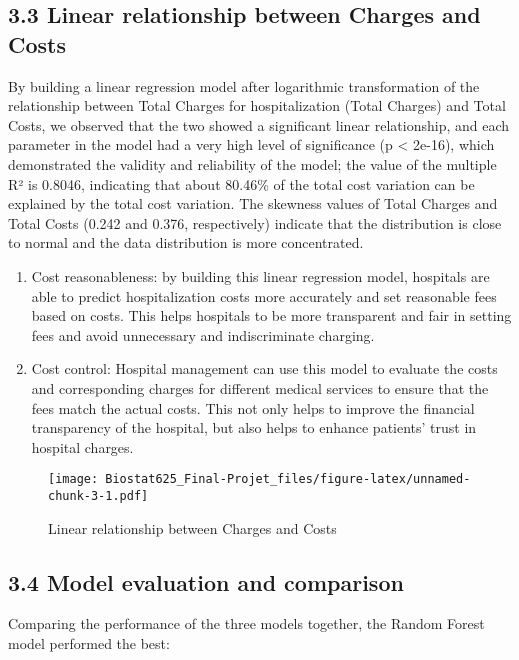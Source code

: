 \documentclass[
  10pt,
]{article}
\begin{document}
\subsection{3.3 Linear relationship between Charges and
Costs}\label{linear-relationship-between-charges-and-costs}

By building a linear regression model after logarithmic transformation
of the relationship between Total Charges for hospitalization (Total
Charges) and Total Costs, we observed that the two showed a significant
linear relationship, and each parameter in the model had a very high
level of significance (p \textless{} 2e-16), which demonstrated the
validity and reliability of the model; the value of the multiple R² is
0.8046, indicating that about 80.46\% of the total cost variation can be
explained by the total cost variation. The skewness values of Total
Charges and Total Costs (0.242 and 0.376, respectively) indicate that
the distribution is close to normal and the data distribution is more
concentrated.

\begin{enumerate}
\def\labelenumi{(\arabic{enumi})}
\item
  Cost reasonableness: by building this linear regression model,
  hospitals are able to predict hospitalization costs more accurately
  and set reasonable fees based on costs. This helps hospitals to be
  more transparent and fair in setting fees and avoid unnecessary and
  indiscriminate charging.
\item
  Cost control: Hospital management can use this model to evaluate the
  costs and corresponding charges for different medical services to
  ensure that the fees match the actual costs. This not only helps to
  improve the financial transparency of the hospital, but also helps to
  enhance patients' trust in hospital charges.
\end{enumerate}

\begin{figure}
\centering
\texttt{[image: Biostat625\_Final-Projet\_files/figure-latex/unnamed-chunk-3-1.pdf]}
\caption{Linear relationship between Charges and Costs}
\end{figure}

\subsection{3.4 Model evaluation and
comparison}\label{model-evaluation-and-comparison}

Comparing the performance of the three models together, the Random
Forest model performed the best:
\end{document}
